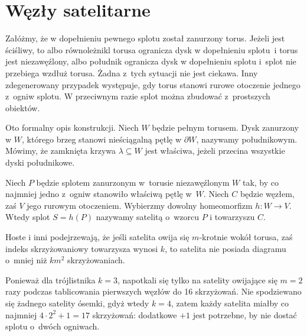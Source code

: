 
\section{Węzły satelitarne}

Załóżmy, że w dopełnieniu pewnego splotu został zanurzony torus.
Jeżeli jest ściśliwy, to albo równoleżnikl torusa ogranicza dysk w dopełnieniu splotu~i torus jest niezawęźlony, albo południk ogranicza dysk w dopełnieniu splotu i~splot nie przebiega wzdłuż torusa.
Żadna z~tych sytuacji nie jest ciekawa.
Inny zdegenerowany przypadek występuje, gdy torus stanowi rurowe otoczenie jednego z~ogniw splotu.
W przeciwnym razie splot można zbudować z~prostszych obiektów.

Oto formalny opis konstrukcji.
Niech $W$ będzie pełnym torusem.
Dysk zanurzony w $W$, którego brzeg stanowi nieściągalną pętlę w $\partial W$, nazywamy południkowym.
Mówimy, że zamknięta krzywa $\lambda \subseteq W$ jest właściwa, jeżeli przecina wszystkie dyski południkowe.

\begin{definition}
%
%
%
    Niech $P$ będzie splotem zanurzonym w~torusie niezawęźlonym $W$ tak, by co najmniej jedno z~ogniw stanowiło właściwą pętlę w~$W$.
    Niech $C$ będzie węzłem, zaś $V$ jego rurowym otoczeniem.
    Wybierzmy dowolny homeomorfizm $h \colon W \to V$.
    Wtedy splot $S = h(P)$ nazywamy satelitą o~wzorcu $P$ i towarzyszu $C$.
\end{definition}


Hoste i inni \cite{thistlethwaite1998} podejrzewają, że jeśli satelita owija się $m$-krotnie wokół torusa, zaś indeks skrzyżowaniowy towarzysza wynosi $k$, to satelita nie posiada diagramu o~mniej niż $km^2$ skrzyżowaniach.
%
%
%

Ponieważ dla trójlistnika $k = 3$, napotkali się tylko na satelity owijające się $m = 2$ razy podczas tablicowania pierwszych węzłów do 16 skrzyżowań.
Nie spodziewano się żadnego satelity ósemki, gdyż wtedy $k = 4$, zatem każdy satelita miałby co najmniej $4 \cdot 2^2 + 1 = 17$ skrzyżowań: dodatkowe $+1$ jest potrzebne, by nie dostać splotu o~dwóch ogniwach.


